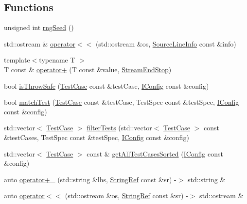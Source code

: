 \subsection*{Functions}
\begin{DoxyCompactItemize}
\item 
unsigned int \mbox{\hyperlink{namespace_catch_acf5ea05e942d2d7fe79111e12754ed76}{rng\+Seed}} ()
\item 
std\+::ostream \& \mbox{\hyperlink{namespace_catch_a6ec18b5054d7fdfdde861c580b082995}{operator$<$$<$}} (std\+::ostream \&os, \mbox{\hyperlink{struct_catch_1_1_source_line_info}{Source\+Line\+Info}} const \&info)
\item 
{\footnotesize template$<$typename T $>$ }\\T const  \& \mbox{\hyperlink{namespace_catch_a5e95b3c47a7618db3649dc39b0bb9004}{operator+}} (T const \&value, \mbox{\hyperlink{struct_catch_1_1_stream_end_stop}{Stream\+End\+Stop}})
\item 
bool \mbox{\hyperlink{namespace_catch_af3e820574c7a0b38d71328c5bd54b0e0}{is\+Throw\+Safe}} (\mbox{\hyperlink{class_catch_1_1_test_case}{Test\+Case}} const \&test\+Case, \mbox{\hyperlink{struct_catch_1_1_i_config}{I\+Config}} const \&config)
\item 
bool \mbox{\hyperlink{namespace_catch_aadef80fbc6bc84589777a462770cef49}{match\+Test}} (\mbox{\hyperlink{class_catch_1_1_test_case}{Test\+Case}} const \&test\+Case, Test\+Spec const \&test\+Spec, \mbox{\hyperlink{struct_catch_1_1_i_config}{I\+Config}} const \&config)
\item 
std\+::vector$<$ \mbox{\hyperlink{class_catch_1_1_test_case}{Test\+Case}} $>$ \mbox{\hyperlink{namespace_catch_ab5da9aa67c42a3f626aea07d0b556829}{filter\+Tests}} (std\+::vector$<$ \mbox{\hyperlink{class_catch_1_1_test_case}{Test\+Case}} $>$ const \&test\+Cases, Test\+Spec const \&test\+Spec, \mbox{\hyperlink{struct_catch_1_1_i_config}{I\+Config}} const \&config)
\item 
std\+::vector$<$ \mbox{\hyperlink{class_catch_1_1_test_case}{Test\+Case}} $>$ const  \& \mbox{\hyperlink{namespace_catch_a1c9b1a23bc947ea70ddaabf067276cf2}{get\+All\+Test\+Cases\+Sorted}} (\mbox{\hyperlink{struct_catch_1_1_i_config}{I\+Config}} const \&config)
\item 
auto \mbox{\hyperlink{namespace_catch_a61711bc909f8dc76d8b3deccc1440f46}{operator+=}} (std\+::string \&lhs, \mbox{\hyperlink{class_catch_1_1_string_ref}{String\+Ref}} const \&sr) -\/$>$ std\+::string \&
\item 
auto \mbox{\hyperlink{namespace_catch_a5e37b333d756a28e12d44977f063af43}{operator$<$$<$}} (std\+::ostream \&os, \mbox{\hyperlink{class_catch_1_1_string_ref}{String\+Ref}} const \&sr) -\/$>$ std\+::ostream \&

\end{DoxyCompactItemize}
